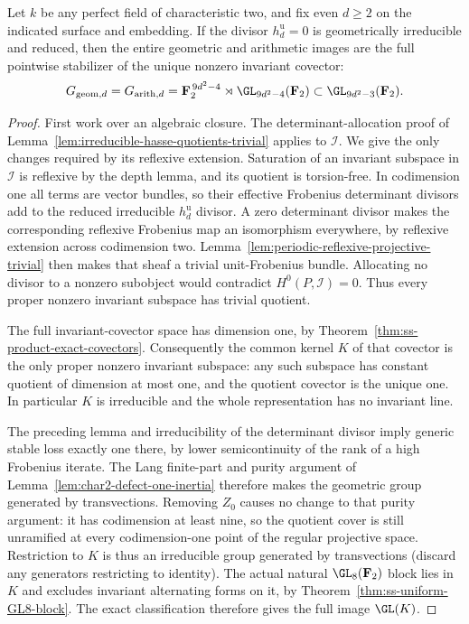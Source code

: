 \begin{theorem}
\label{thm:ss-even-full-group-if-unit-Hasse-irreducible}
Let $k$ be any perfect field of characteristic two, and fix even
$d\ge2$ on the indicated surface and embedding. If the divisor
$h_d^{\mathrm u}=0$ is
geometrically irreducible and reduced, then the entire geometric
and arithmetic images are the full pointwise stabilizer of the
unique nonzero invariant covector:
\[
 G_{\mathrm{geom},d}=G_{\mathrm{arith},d}
   =\mathbf F_2^{\,9d^2-4}\rtimes\GL_{9d^2-4}(\mathbf F_2)
       \subset\GL_{9d^2-3}(\mathbf F_2).
\]
\end{theorem}

\begin{proof}
First work over an algebraic closure. The determinant-allocation
proof of Lemma~\ref{lem:irreducible-hasse-quotients-trivial}
applies to $\mathcal I$. We give the only changes required by
its reflexive extension. Saturation of an invariant subspace in
$\mathcal I$ is reflexive by the depth lemma, and its quotient
is torsion-free. In codimension one all terms are vector bundles,
so their effective Frobenius determinant divisors add to the
reduced irreducible $h_d^{\mathrm u}$ divisor. A zero determinant
divisor makes the corresponding reflexive Frobenius map an
isomorphism everywhere, by reflexive extension across codimension
two. Lemma~\ref{lem:periodic-reflexive-projective-trivial} then
makes that sheaf a trivial unit-Frobenius bundle.
Allocating no divisor to a nonzero subobject would contradict
$H^0(P,\mathcal I)=0$. Thus every proper nonzero invariant
subspace has trivial quotient.

The full invariant-covector space has dimension one, by
Theorem~\ref{thm:ss-product-exact-covectors}.
Consequently the common kernel $K$ of that covector is the
only proper nonzero invariant subspace: any such subspace has
constant quotient of dimension at most one, and the quotient
covector is the unique one. In particular $K$ is irreducible
and the whole representation has no invariant line.

The preceding lemma and irreducibility of the determinant
divisor imply generic stable loss exactly one there, by lower
semicontinuity of the rank of a high Frobenius iterate.
The Lang finite-part and purity argument of
Lemma~\ref{lem:char2-defect-one-inertia} therefore makes the
geometric group generated by transvections. Removing $Z_0$
causes no change to that purity argument: it has codimension
at least nine, so the quotient cover is still unramified at
every codimension-one point of the regular projective space.
Restriction to $K$ is thus an irreducible group generated by
transvections (discard any generators restricting to identity).
The actual natural $\GL_8(\mathbf F_2)$ block lies in $K$ and
excludes invariant alternating forms on it, by
Theorem~\ref{thm:ss-uniform-GL8-block}.
The exact classification
\cite[Theorem~3.6, printed p.~22]{KantorSeress2001}
therefore gives the full image $\GL(K)$.


\end{proof}
